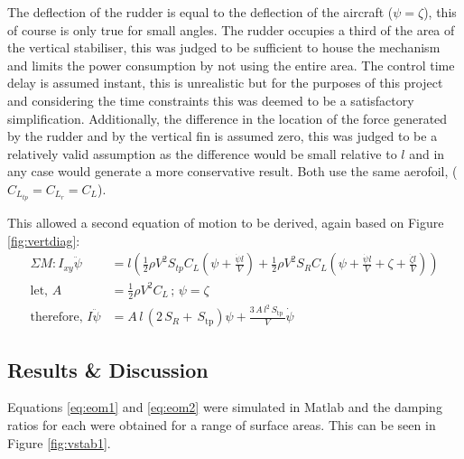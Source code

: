\documentclass[11pt,a4paper]{article}
\begin{document}
The deflection of the rudder is equal to the deflection of the aircraft ($\psi=\zeta$), this of course is only true for small angles. The rudder occupies a third of the area of the vertical stabiliser, this was judged to be sufficient to house the mechanism and limits the power consumption by not using the entire area. The control time delay is assumed instant, this is unrealistic but for the purposes of this project and considering the time constraints this was deemed to be a satisfactory simplification. Additionally, the difference in the location of the force generated by the rudder and by the vertical fin is assumed zero, this was judged to be a relatively valid assumption as the difference would be small relative to $l$ and in any case would generate a more conservative result. Both use the same aerofoil, ($C_{L_{tp}}=C_{L_{r}}=C_L$).

This allowed a second equation of motion to be derived, again based on Figure \ref{fig:vertdiag}:
\begin{align}{}
\Sigma M: I_{xy}\ddot{\psi}&=l(\frac{1}{2}\rho V^2 S_{tp}C_L(\psi+\frac{\dot{\psi}l}{V})+\frac{1}{2}\rho V^2 S_R C_L(\psi+\frac{\dot{\psi}l}{V}+\zeta+\frac{\dot{\zeta}l}{V})) \\
\text{let,}\,\,A&=\frac{1}{2}\rho V^2 C_L\,;\, \psi=\zeta\\
 \text{therefore,}\,\,I\ddot{\psi}&=A\,l\,\left(2\,S_{R}+\,S_{\mathrm{tp}} \right) \psi+\frac{3\,A\,l^2\,S_{\mathrm{tp}}\,}{V} \dot{\psi} \label{eq:eom2}
\end{align}{}

\subsection{Results \& Discussion}
Equations \ref{eq:eom1} and \ref{eq:eom2} were simulated in Matlab and the damping ratios for each were obtained for a range of surface areas. This can be seen in Figure \ref{fig:vstab1}.
\end{document}

